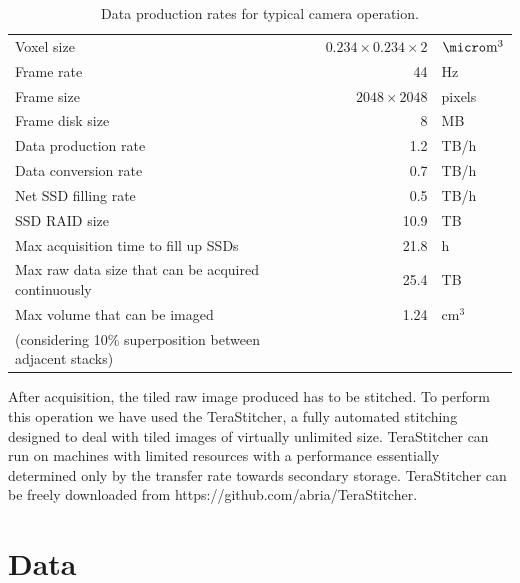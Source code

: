 \documentclass[12pt]{spieman}  %
\begin{document}
\begin{table}%
	\centering
		\caption[Data production]{Data production rates for typical camera operation.\label{tab:dataproduction}}
		\begin{tabular}{lrl}
		\\
		Voxel size																								& $0.234 \times 0.234 \times 2$	& $\micro\text{m}^3$ 	\\
		Frame rate																								& 44														& Hz								\\
		Frame size																								& $2048 \times 2048$ 						& pixels						\\
		Frame disk size																						& 8									 						& MB								\\
		Data production rate																			& 1.2								 						& TB/h 							\\
		Data conversion rate																			& 0.7								 						& TB/h 							\\
		Net SSD filling rate																			& 0.5								 						& TB/h 							\\
		SSD RAID size																							& 10.9							 						& TB								\\
		Max acquisition time to fill up SSDs											& 21.8							 						& h									\\
		Max raw data size that can be acquired continuously				& 25.4							 						& TB								\\
		Max volume that can be imaged 														& 1.24							 						& $\text{cm}^3$ 		\\
		(considering 10\% superposition between adjacent stacks)	&										 						&										\\
		\end{tabular}
\end{table}


After acquisition, the tiled raw image produced has to be stitched. To perform this operation we have used the TeraStitcher\cite{Bria2012}, a fully automated stitching designed to deal with tiled images of virtually unlimited size. TeraStitcher can run on machines with limited resources with a performance essentially determined only by the transfer rate towards secondary storage. TeraStitcher can be freely downloaded from https://github.com/abria/TeraStitcher.

\section{Data}
\end{document}
